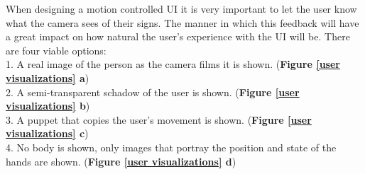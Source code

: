 When designing a motion controlled UI it is very important to let the user know what the camera sees of their signs. The manner in which this feedback will have a great impact on how natural the user's experience with the UI will be. There are four viable options: \\
 1. A real image of the person as the camera films it is shown.   (\textbf{Figure \ref{user visualizations} a}) \\
 2. A semi-transparent schadow of the user is shown. (\textbf{Figure \ref{user visualizations} b}) \\
 3. A puppet that copies the user's movement is shown.  (\textbf{Figure \ref{user visualizations} c}) \\
 4. No body is shown, only images that portray the position and state of the hands are shown. (\textbf{Figure \ref{user visualizations} d}) \\ \\
 
